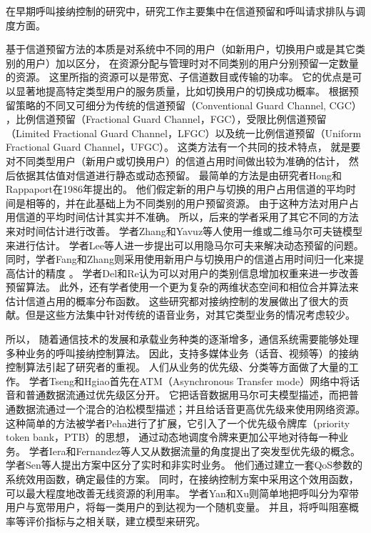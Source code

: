 在早期呼叫接纳控制的研究中，研究工作主要集中在信道预留和呼叫请求排队与调度方面。

基于信道预留方法的本质是对系统中不同的用户（如新用户，切换用户或是其它类别的用户）加以区分，
在资源分配与管理时对不同类别的用户分别预留一定数量的资源。
这里所指的资源可以是带宽、子信道数目或传输的功率。
它的优点是可以显著地提高特定类型用户的服务质量，比如切换用户的切换成功概率。
根据预留策略的不同又可细分为传统的信道预留（Conventional Guard Channel, CGC）
\cite{Hong:1986}\cite{Lunayach:1982}\cite{Posner:1985}，比例信道预留（Fractional Guard Channel，FGC）\cite{Ramjee:1997}\cite{Y-G-Fang.TVT.2002}\cite{Vazquez:2006}，受限比例信道预留（Limited Fractional Guard Channel，LFGC）\cite{CruzPerez:1999}以及统一比例信道预留（Uniform Fractional Guard Channel，UFGC）\cite{Beigy:2004}。
这类方法有一个共同的技术特点，
就是要对不同类型用户（新用户或切换用户）的信道占用时间做出较为准确的估计，
然后依据其估值对信道进行静态或动态预留。
最简单的方法是由研究者Hong和Rappaport在1986年提出的\cite{Hong:1986}。
他们假定新的用户与切换的用户占用信道的平均时间是相等的，并在此基础上为不同类别的用户预留资源。
由于这种方法对用户占用信道的平均时间估计其实并不准确。
所以，后来的学者采用了其它不同的方法来对时间估计进行改善。
学者Zhang和Yavuz等人使用一维或二维马尔可夫链模型来进行估计\cite{Zhang:2003}\cite{Yavuz:2006}\cite{Sindal:2008}。
学者Lee等人进一步提出可以用隐马尔可夫来解决动态预留的问题\cite{LeeWu2006}。
同时，学者Fang和Zhang则采用使用新用户与切换用户的信道占用时间归一化来提高估计的精度 \cite{Y-G-Fang.TVT.2002}。
学者Del和Re认为可以对用户的类别信息增加权重来进一步改善预留算法\cite{Del1995}。
此外，还有学者使用一个更为复杂的两维状态空间和相位合并算法来估计信道占用的概率分布函数\cite{Melikov:2006}。
这些研究都对接纳控制的发展做出了很大的贡献。但是这些方法集中针对传统的语音业务，对其它类型业务的情况考虑较少。

所以，
随着通信技术的发展和承载业务种类的逐渐增多，通信系统需要能够处理多种业务的呼叫接纳控制算法。
因此，支持多媒体业务（话音、视频等）的接纳控制算法引起了研究者的重视。
人们从业务的优先级、分类等方面做了大量的工作。
学者Tseng和Hgiao首先在ATM（Asynchronous Transfer mode）网络中将话音和普通数据流通过优先级区分开。
它把话音数据用马尔可夫模型描述，而把普通数据流通过一个混合的泊松模型描述；并且给话音更高优先级来使用网络资源\cite{Tseng:1991}。
这种简单的方法被学者Peha进行了扩展，它引入了一个优先级令牌库（priority token bank，PTB）的思想，
通过动态地调度令牌来更加公平地对待每一种业务\cite{Peha:1993}。
学者Iera和Fernandez等人又从数据流量的角度提出了突发型优先级的概念\cite{Iera:1996}\cite{Fernandez:1997}。
学者Sen等人提出方案中区分了实时和非实时业务。
他们通过建立一套QoS参数的系统效用函数，确定最佳的方案。
同时，在接纳控制方案中采用这个效用函数，可以最大程度地改善无线资源的利用率\cite{Sen:1998}。
学者Yan和Xu则简单地把呼叫分为窄带用户与宽带用户，将每一类用户的到达视为一个随机变量。
并且，将呼叫阻塞概率等评价指标与之相关联，建立模型来研究\cite{Yan:2008}\cite{Xu:2007}。

